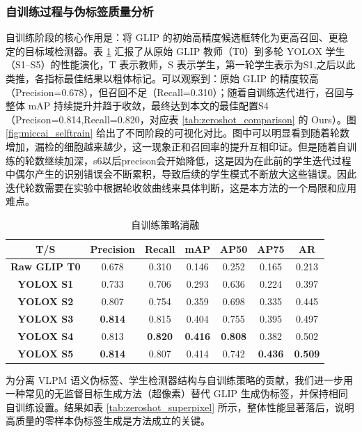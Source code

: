 \subsubsection{自训练过程与伪标签质量分析}
自训练阶段的核心作用是：将 GLIP 的初始高精度候选框转化为更高召回、更稳定的目标域检测器。表 \ref{tab:zeroshot_selftrain} 汇报了从原始 GLIP 教师（T0）到多轮 YOLOX 学生（S1--S5）的性能演化，T 表示教师，S 表示学生，第一轮学生表示为S1,之后以此类推，各指标最佳结果以粗体标记。可以观察到：原始 GLIP 的精度较高（Precision=0.678），但召回不足（Recall=0.310）；随着自训练迭代进行，召回与整体 mAP 持续提升并趋于收敛，最终达到本文的最佳配置S4（Precison=0.814,Recall=0.820，对应表 \ref{tab:zeroshot_comparison} 的 Ours）。图 \ref{fig:miccai_selftrain} 给出了不同阶段的可视化对比。图中可以明显看到随着轮数增加，漏检的细胞越来越少，这一现象正和召回率的提升互相印证。但是随着自训练的轮数继续加深，s6以后precison会开始降低，这是因为在此前的学生迭代过程中偶尔产生的识别错误会不断累积，导致后续的学生模式不断放大这些错误。因此迭代轮数需要在实验中根据轮收敛曲线来具体判断，这是本方法的一个局限和应用难点。
\begin{table}[htbp]
  \centering
  \renewcommand{\arraystretch}{1.1}
  \caption{自训练策略消融}
  \label{tab:zeroshot_selftrain}
  \begin{tabular}{c|cc|cccc}
    \hline
    \textbf{T/S} & \textbf{Precision} & \textbf{Recall} & \textbf{mAP} & \textbf{AP50} & \textbf{AP75} & \textbf{AR} \\ \hline
    \textbf{Raw GLIP T0} & 0.678 & 0.310 & 0.146 & 0.252 & 0.165 & 0.213 \\
    \textbf{YOLOX S1} & 0.733 & 0.706 & 0.293 & 0.636 & 0.224 & 0.397 \\
    \textbf{YOLOX S2} & 0.807 & 0.754 & 0.359 & 0.698 & 0.335 & 0.445 \\
    \textbf{YOLOX S3} & \textbf{0.814} & 0.815 & 0.404 & 0.755 & 0.395 & 0.497 \\
    \textbf{YOLOX S4} & 0.813 & \textbf{0.820} & \textbf{0.416} & \textbf{0.808} & 0.382 & 0.502 \\
    \textbf{YOLOX S5} & \textbf{0.814} & 0.807 & 0.414 & 0.742 & \textbf{0.436} & \textbf{0.509} \\ \hline
  \end{tabular}
\end{table}

为分离 VLPM 语义伪标签、学生检测器结构与自训练策略的贡献，我们进一步用一种常见的无监督目标生成方法（超像素）替代 GLIP 生成伪标签，并保持相同自训练设置。结果如表 \ref{tab:zeroshot_superpixel} 所示，整体性能显著落后，说明高质量的零样本伪标签生成是方法成立的关键。


